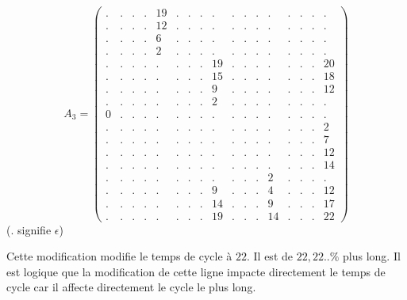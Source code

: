 \begin{equation}
A_3 = \left(\begin{array}{ccccccccccccccccc}
. & . & . & . & 19 &  . & . & . & . &  . & . & . & . &  . & . & . & .  \\
. & . & . & . & 12 & . & . & . & . &  . & . & . & . &  . & . & . & .  \\
. & . & . & . & 6 &  . & . & . & . &  . & . & . & . &  . & . & . & .  \\
. & . & . & . & 2 &  . & . & . & . &  . & . & . & . &  . & . & . & .  \\
. & . & . & . & . &  . & . & . & 19 & . & . & . & . &  . & . & . & 20  \\
. & . & . & . & . &  . & . & . & 15 & . & . & . & . &  . & . & . & 18  \\
. & . & . & . & . &  . & . & . & 9 &  . & . & . & . &  . & . & . & 12  \\
. & . & . & . & . &  . & . & . & 2 &  . & . & . & . &  . & . & . & .  \\
0 & . & . & . & . &  . & . & . & . &  . & . & . & . &  . & . & . & .  \\
. & . & . & . & . &  . & . & . & . &  . & . & . & . &  . & . & . & 2  \\
. & . & . & . & . &  . & . & . & . &  . & . & . & . &  . & . & . & 7  \\
. & . & . & . & . &  . & . & . & . &  . & . & . & . &  . & . & . & 12  \\
. & . & . & . & . &  . & . & . & . &  . & . & . & . &  . & . & . & 14  \\
. & . & . & . & . &  . & . & . & . &  . & . & . & 2 &  . & . & . & .  \\
. & . & . & . & . &  . & . & . & 9 &  . & . & . & 4 &  . & . & . & 12  \\
. & . & . & . & . &  . & . & . & 14 & . & . & . & 9 &  . & . & . & 17  \\
. & . & . & . & . &  . & . & . & 19 & . & . & . & 14 & . & . & . & 22 
\end{array}\right)
\end{equation}
($.$ signifie $\epsilon$)

Cette modification modifie le temps de cycle à $22$. Il est de $22,22..\%$ plus long. Il est logique que la modification de cette ligne impacte directement le temps de cycle car il affecte directement le cycle le plus long.

